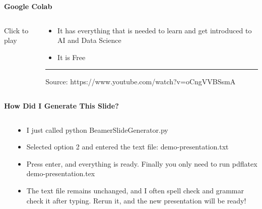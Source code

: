 \documentclass[aspectratio=169]{beamer}
\begin{document}
\begin{frame}{\Large\textbf{Google Colab}}
    \vspace{0.5em}
    \begin{columns}
        \begin{column}{0.48\textwidth}
            \centering

            \vspace{0.5em}
            \footnotesize{Click to play}
        \end{column}%
        \begin{column}{0.48\textwidth}
            \begin{itemize}
                \item It has everything that is needed to learn and get introduced to AI and Data Science
                \item It is Free
            \end{itemize}
            \vspace{0.5em}
            \rule{0.9\textwidth}{0.4pt}
            {\tiny Source: https://www.youtube.com/watch?v=oCngVVBSsmA}
        \end{column}
    \end{columns}
\end{frame}


\begin{frame}{\Large\textbf{How Did I Generate This Slide?}}
    \vspace{0.5em}
    \begin{columns}
        \begin{column}{0.48\textwidth}
            \centering
        \end{column}%
        \begin{column}{0.48\textwidth}
            \begin{itemize}
                \item I just called \textcolor[RGB]{255,165,0}{python BeamerSlideGenerator.py}
                \item Selected option 2 and entered the text file:  demo-presentation.txt
                \item Press enter, and everything is ready. Finally you only need to run \textcolor[RGB]{255,165,0}{pdflatex demo-presentation.tex}
                \item The text file remains unchanged, and I often spell check and grammar check it after typing. Rerun it, and the new presentation will be ready!
            \end{itemize}
        \end{column}
    \end{columns}
\end{frame}
\end{document}
